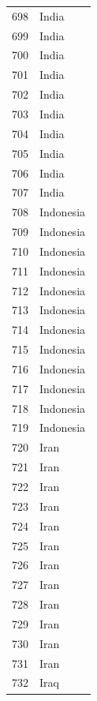 \documentclass[
  letterpaper,
  DIV=11,
  numbers=noendperiod]{scrreprt}
\begin{document}
\begin{tabular}{ll}
698  &                     India \\
699  &                     India \\
700  &                     India \\
701  &                     India \\
702  &                     India \\
703  &                     India \\
704  &                     India \\
705  &                     India \\
706  &                     India \\
707  &                     India \\
708  &                 Indonesia \\
709  &                 Indonesia \\
710  &                 Indonesia \\
711  &                 Indonesia \\
712  &                 Indonesia \\
713  &                 Indonesia \\
714  &                 Indonesia \\
715  &                 Indonesia \\
716  &                 Indonesia \\
717  &                 Indonesia \\
718  &                 Indonesia \\
719  &                 Indonesia \\
720  &                      Iran \\
721  &                      Iran \\
722  &                      Iran \\
723  &                      Iran \\
724  &                      Iran \\
725  &                      Iran \\
726  &                      Iran \\
727  &                      Iran \\
728  &                      Iran \\
729  &                      Iran \\
730  &                      Iran \\
731  &                      Iran \\
732  &                      Iraq \\

\end{tabular}
\end{document}
